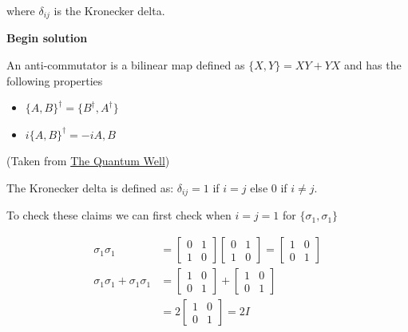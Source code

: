 \documentclass[11pt]{article}
\begin{document}
\begin{enumerate}
\begin{enumerate}
		            where $\delta_{ij}$ is the Kronecker delta.

		            \textbf{Begin solution}

		            An anti-commutator is a bilinear map defined as $\{X,Y\} = XY + YX$ and has the following properties

		            \begin{itemize}
			            \item $\{A,B\}^{\dagger} = \{B^\dagger, A^\dagger\}$
			            \item $i\{A,B\}^\dagger = -i{A,B}$
		            \end{itemize}

		            (Taken from \href{https://publish.obsidian.md/myquantumwell/Quantum+Mechanics/Anti-commutators+in+quantum+mechanics}{The Quantum Well})

		            The Kronecker delta is defined as: $\delta_{ij} = 1$ if $i = j $ else $0$ if $i \ne j$.

		            To check these claims we can first check when $i = j = 1$ for $\{\sigma_1, \sigma_1\}$

		            \begin{align*}
			            \sigma_1 \sigma_1                     & =
			            \begin{bmatrix} 0 & 1 \\ 1 & 0 \end{bmatrix}
			            \begin{bmatrix} 0 & 1 \\ 1 & 0 \end{bmatrix} =
			            \begin{bmatrix}
				            1 & 0 \\ 0 & 1
			            \end{bmatrix}                             \\
			            \sigma_1 \sigma_1 + \sigma_1 \sigma_1 & =
			            \begin{bmatrix}
				            1 & 0 \\ 0 & 1
			            \end{bmatrix} +
			            \begin{bmatrix}
				            1 & 0 \\ 0 & 1
			            \end{bmatrix}                             \\
			                                                  & = 2
			            \begin{bmatrix}
				            1 & 0 \\ 0 & 1
			            \end{bmatrix} = 2I
		            \end{align*}


\end{enumerate}
\end{enumerate}
\end{document}
